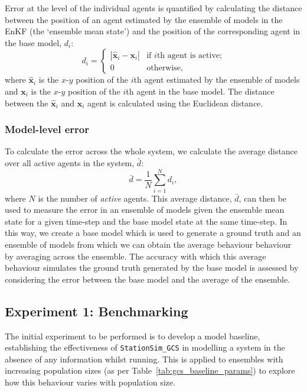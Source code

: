 \documentclass{article}
\begin{document}
Error at the level of the individual agents is quantified by calculating the distance between the position of an agent estimated by the ensemble of models in the EnKF (the `ensemble mean state') and the position of the corresponding agent in the base model, $d_i$:
\begin{equation}
    d_i = 
    \begin{cases}
        | \hat{\mathbf{x}}_i - \mathbf{x}_i | & \text{if $i$th agent is
        active;}\\
        0 & \text{otherwise,}
    \end{cases}
    \label{eq:agent_level_error1}
\end{equation}
where $\hat{\mathbf{x}}_i$ is the $x$-$y$ position of the $i$th agent estimated by the ensemble of models and $\mathbf{x}_i$ is the $x$-$y$ position of the $i$th agent in the base model. The distance between the $\hat{\mathbf{x}}_i$ and $\mathbf{x}_i$ agent is calculated using the Euclidean distance.

\subsubsection{Model-level error}

To calculate the error across the whole system, we calculate the average distance over all active agents in the system, $\bar{d}$:
\begin{equation}
    \bar{d} = \frac{1}{N} \sum_{i=1}^{N} d_i,
    \label{eq:model_level_error1}
\end{equation}
where $N$ is the number of \emph{active} agents. This average distance, $\bar{d}$, can then be used to measure the error in an ensemble of models given the ensemble mean state for a given time-step and the base model state at the same time-step. 
In this way, we create a base model which is used to generate a ground truth and an ensemble of models from which we can obtain the average behaviour behaviour by averaging across the ensemble. 
The accuracy with which this average behaviour simulates the ground truth generated by the base model is assessed by considering the error between the base model and the average of the ensemble.



\subsection{Experiment 1: Benchmarking}\label{sub:exp:bench}

The initial experiment to be performed is to develop a model baseline, establishing the effectiveness of \texttt{StationSim\_GCS} in modelling a system in the absence of any information whilst running. This is applied to ensembles with increasing population sizes (as per Table~\ref{tab:gcs_baseline_params}) to explore how this behaviour varies with population size.
\end{document}
